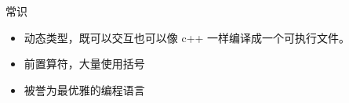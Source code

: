 
常识
\begin{itemize}
\item 动态类型，既可以交互也可以像 c++ 一样编译成一个可执行文件。
\item 前置算符，大量使用括号
\item 被誉为最优雅的编程语言
\end{itemize}

